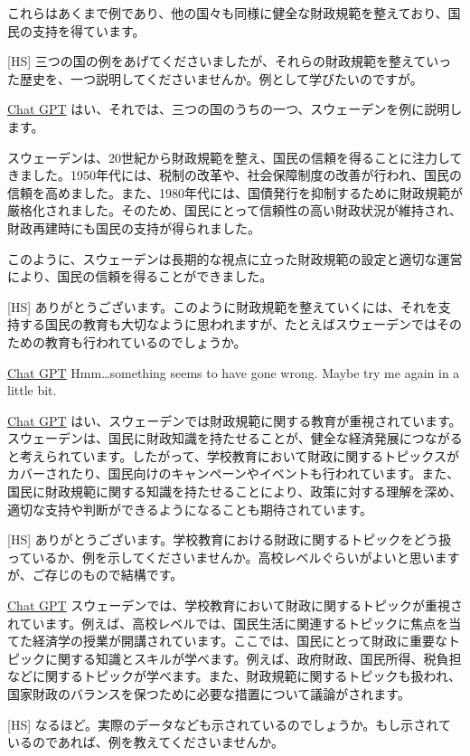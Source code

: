 \documentclass[
]{bxjsbook}
\theoremstyle{definition}
\theoremstyle{definition}
\theoremstyle{definition}
\theoremstyle{definition}
\theoremstyle{remark}
\begin{document}
これらはあくまで例であり、他の国々も同様に健全な財政規範を整えており、国民の支持を得ています。

{[}HS{]} 三つの国の例をあげてくださいましたが、それらの財政規範を整えていった歴史を、一つ説明してくださいませんか。例として学びたいのですが。

\protect\hyperlink{chatgpt}{Chat GPT} はい、それでは、三つの国のうちの一つ、スウェーデンを例に説明します。

スウェーデンは、20世紀から財政規範を整え、国民の信頼を得ることに注力してきました。1950年代には、税制の改革や、社会保障制度の改善が行われ、国民の信頼を高めました。また、1980年代には、国債発行を抑制するために財政規範が厳格化されました。そのため、国民にとって信頼性の高い財政状況が維持され、財政再建時にも国民の支持が得られました。

このように、スウェーデンは長期的な視点に立った財政規範の設定と適切な運営により、国民の信頼を得ることができました。

{[}HS{]} ありがとうございます。このように財政規範を整えていくには、それを支持する国民の教育も大切なように思われますが、たとえばスウェーデンではそのための教育も行われているのでしょうか。

\protect\hyperlink{chatgpt}{Chat GPT} Hmm\ldots something seems to have gone wrong. Maybe try me again in a little bit.

\protect\hyperlink{chatgpt}{Chat GPT} はい、スウェーデンでは財政規範に関する教育が重視されています。スウェーデンは、国民に財政知識を持たせることが、健全な経済発展につながると考えられています。したがって、学校教育において財政に関するトピックスがカバーされたり、国民向けのキャンペーンやイベントも行われています。また、国民に財政規範に関する知識を持たせることにより、政策に対する理解を深め、適切な支持や判断ができるようになることも期待されています。

{[}HS{]} ありがとうございます。学校教育における財政に関するトピックをどう扱っているか、例を示してくださいませんか。高校レベルぐらいがよいと思いますが、ご存じのもので結構です。

\protect\hyperlink{chatgpt}{Chat GPT} スウェーデンでは、学校教育において財政に関するトピックが重視されています。例えば、高校レベルでは、国民生活に関連するトピックに焦点を当てた経済学の授業が開講されています。ここでは、国民にとって財政に重要なトピックに関する知識とスキルが学べます。例えば、政府財政、国民所得、税負担などに関するトピックが学べます。また、財政規範に関するトピックも扱われ、国家財政のバランスを保つために必要な措置について議論がされます。

{[}HS{]} なるほど。実際のデータなども示されているのでしょうか。もし示されているのであれば、例を教えてくださいませんか。
\end{document}
